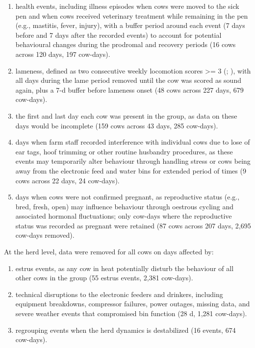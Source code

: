 \documentclass[
]{article}
\begin{document}
\begin{enumerate}
\def\labelenumi{(\arabic{enumi})}
\item
  health events, including illness episodes when cows were moved to the
  sick pen and when cows received veterinary treatment while remaining
  in the pen (e.g., mastitis, fever, injury), with a buffer period
  around each event (7 days before and 7 days after the recorded events)
  to account for potential behavioural changes during the prodromal and
  recovery periods (16 cows across 120 days, 197 cow-days).
\item
  lameness, defined as two consecutive weekly locomotion scores
  \textgreater= 3 (; ), with
  all days during the lame period removed until the cow was scored as
  sound again, plus a 7-d buffer before lameness onset (48 cows across
  227 days, 679 cow-days).
\item
  the first and last day each cow was present in the group, as data on
  these days would be incomplete (159 cows across 43 days, 285
  cow-days).
\item
  days when farm staff recorded interference with individual cows due to
  lose of ear tags, hoof trimming or other routine husbandry procedures,
  as these events may temporarily alter behaviour through handling
  stress or cows being away from the electronic feed and water bins for
  extended period of times (9 cows across 22 days, 24 cow-days).
\item
  days when cows were not confirmed pregnant, as reproductive status
  (e.g., bred, fresh, open) may influence behaviour through oestrous
  cycling and associated hormonal fluctuations; only cow-days where the
  reproductive status was recorded as pregnant were retained (87 cows
  across 207 days, 2,695 cow-days removed).
\end{enumerate}

At the herd level, data were removed for all cows on days affected by:

\begin{enumerate}
\def\labelenumi{(\arabic{enumi})}
\item
  estrus events, as any cow in heat potentially disturb the behaviour of
  all other cows in the group (55 estrus events, 2,381 cow-days).
\item
  technical disruptions to the electronic feeders and drinkers,
  including equipment breakdowns, compressor failures, power outages,
  missing data, and severe weather events that compromised bin function
  (28 d, 1,281 cow-days).
\item
  regrouping events when the herd dynamics is destabilized (16 events,
  674 cow-days).
\end{enumerate}
\end{document}
